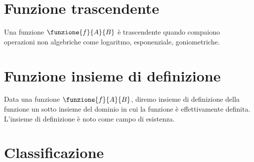 \section{Funzione trascendente}
	Una funzione $\funzione{f}{A}{B}$  è trascendente quando compaiono operazioni non algebriche come logaritmo, esponenziale, goniometriche.
\section{Funzione insieme di definizione}
Data una funzione $\funzione{f}{A}{B}$, diremo insieme di definizione della funzione un sotto insieme del dominio in cui la funzione è effettivamente definita. L'insieme di definizione è noto come campo di esistenza.

\begin{center}
	
\end{center}
\section{Classificazione}
\begin{center}
	
\end{center}
